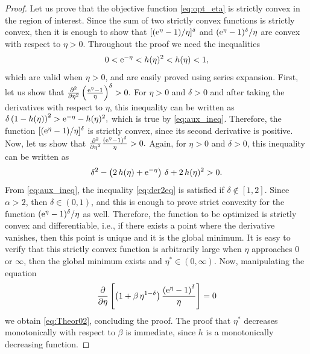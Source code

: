 \begin{proof}
	Let us prove that the objective function \eqref{eq:opt_eta} is strictly convex in the region of interest. Since the sum of two strictly convex functions is strictly convex, then it is enough to show that ${[(\mathrm{e}^\eta-1)/\eta]^\delta}$ and ${(\mathrm{e}^\eta-1)^\delta/\eta}$ are convex with respect to $\eta > 0$. Throughout the proof we need the inequalities
    \begin{equation} \label{eq:aux_ineq}
    	0 < \mathrm{e}^{-\eta} < h(\eta)^2 < h(\eta) < 1,
    \end{equation}
    which are valid when $\eta > 0$, and are easily proved using series expansion. First, let us show that
    $
    	{\frac{\partial^2}{\partial \eta^2} \left(\frac{\mathrm{e}^\eta-1}
        {\eta}\right)^\delta > 0}.
    $
    For $\eta > 0$ and $\delta > 0$ and after taking the derivatives with respect to $\eta$, this inequality can be written as
	$
	{\delta\left( 1 - h(\eta) \right)^2 > \mathrm{e}^{-\eta} - h(\eta)^2},
	$
which is true by \eqref{eq:aux_ineq}. Therefore, the function ${[(\mathrm{e}^\eta-1)/\eta]^\delta}$ is strictly convex, since its second derivative is positive. Now, let us show that
	$
		\frac{\partial^2}{\partial \eta^2} 
        \frac{(\mathrm{e}^\eta-1)^\delta}{\eta} > 0.
	$
	Again, for $\eta > 0$ and $\delta > 0$, this inequality can be written as
\begin{equation}\label{eq:der2eq}
	\delta^2 - \left(2\,h(\eta) +
    \mathrm{e}^{-\eta} \right)\,\delta + 2\,h(\eta)^2 > 0.
\end{equation}
	From \eqref{eq:aux_ineq}, the inequality \eqref{eq:der2eq} is satisfied if $\delta \notin [1,2]$. Since $\alpha >2$, then $\delta\in(0,1)$, and this is enough to prove strict convexity for the function ${(\mathrm{e}^\eta-1)^\delta/\eta}$ as well. Therefore, the function to be optimized is strictly convex and differentiable, i.e., if there exists a point where the derivative vanishes, then this point is unique and it is the global minimum.
    It is easy to verify that this strictly convex function is arbitrarily large when $\eta$ approaches 0 or $\infty$, then the global minimum exists and $\eta^*\in(0,\infty)$. Now, manipulating the equation 
\begin{equation*}
\frac{\partial}{\partial\eta} \left[ \left( 1 + \beta\,\eta^{1-\delta}\right)  \frac{\left(\mathrm{e}^\eta-1\right)^\delta}{\eta}\right] = 0
\end{equation*}
we obtain \eqref{eq:Theor02}, concluding the proof.
The proof that $\eta^*$ decreases monotonically with respect to $\beta$ is immediate, since $h$ is a monotonically decreasing function.
\end{proof}

